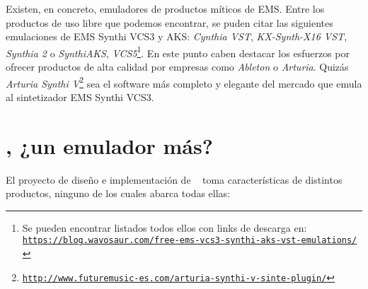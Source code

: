 Existen, en concreto, emuladores de productos míticos de EMS. Entre los productos de uso libre que podemos encontrar, se puden citar las siguientes emulaciones de EMS Synthi VCS3 y AKS: \textit{Cynthia VST}, \textit{KX-Synth-X16 VST}, \textit{Synthia 2} o \textit{SynthiAKS}, \textit{VCS5}\footnote{Se pueden encontrar listados todos ellos con links de descarga en: \href{https://blog.wavosaur.com/free-ems-vcs3-synthi-aks-vst-emulations/}{\texttt{https://blog.wavosaur.com/free-ems-vcs3-synthi-aks-vst-emulations/}}}. En este punto caben destacar los esfuerzos por ofrecer productos de alta calidad por empresas como \textit{Ableton} o \textit{Arturia}. Quizás \textit{Arturia Synthi V}\footnote{\href{http://www.futuremusic-es.com/arturia-synthi-v-sinte-plugin/}{\texttt{http://www.futuremusic-es.com/arturia-synthi-v-sinte-plugin/}}} sea el software más completo y elegante del mercado que emula al sintetizador EMS Synthi VCS3.


\section[\appName, ¿un emulador más?]{\appName, ¿un emulador más?}

El proyecto de diseño e implementación de \appName~ toma características de distintos productos, ninguno de los cuales abarca todas ellas:

